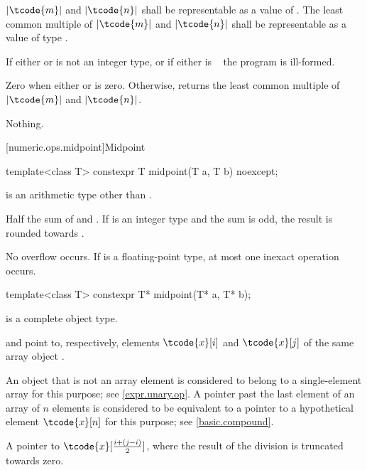 \begin{itemdescr}
\pnum
\requires
$|\tcode{m}|$ and $|\tcode{n}|$
shall be representable as a value of .
The least common multiple of $|\tcode{m}|$ and $|\tcode{n}|$
shall be representable as a value of type .

\pnum
\remarks
If either  or  is not an integer type, or
if either is \cv{}~ the program is ill-formed.

\pnum
\returns
Zero when either  or  is zero.
Otherwise, returns the least common multiple of $|\tcode{m}|$ and $|\tcode{n}|$.

\pnum
\throws
Nothing.
\end{itemdescr}

[numeric.ops.midpoint]{Midpoint}

%
\begin{itemdecl}
template<class T>
  constexpr T midpoint(T a, T b) noexcept;
\end{itemdecl}
\begin{itemdescr}
\pnum
\constraints
{} is an arithmetic type other than .

\pnum
\returns
Half the sum of  and .
If  is an integer type and the sum is odd,
the result is rounded towards .

\pnum
\remarks
No overflow occurs.
If  is a floating-point type, at most one inexact operation occurs.
\end{itemdescr}

%
\begin{itemdecl}
template<class T>
  constexpr T* midpoint(T* a, T* b);
\end{itemdecl}
\begin{itemdescr}
\pnum
\constraints
{} is a complete object type.

\pnum
\expects
{} and  point to, respectively,
elements $\tcode{x}[i]$ and $\tcode{x}[j]$ of the same array object .
\begin{note}
An object that is not an array element is considered to belong
to a single-element array for this purpose; see \ref{expr.unary.op}.
A pointer past the last element of an array  of $n$ elements
is considered to be equivalent to a pointer
to a hypothetical element $\tcode{x}[n]$ for this purpose;
see \ref{basic.compound}.
\end{note}

\pnum
\returns
A pointer to $\tcode{x}[\frac{i+(j-i)}{2}]$,
where the result of the division is truncated towards zero.
\end{itemdescr}

